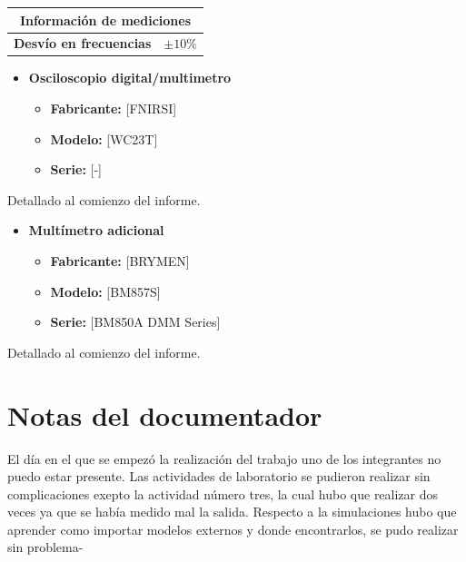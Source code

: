 
\begin{center}
\renewcommand{\arraystretch}{1.2}
\begin{tabular}{| m{4cm}| m{3cm} |}
\hline
\multicolumn{2}{|c|}{\textbf{Información de mediciones}} \\
\hline
\textbf{Desvío en frecuencias} & $\pm 10\%$ \\
\hline
\end{tabular}
\end{center}

\begin{itemize}
\item \textbf{Osciloscopio digital/multimetro}
\begin{itemize}
\item \textbf{Fabricante:} [FNIRSI]
\item \textbf{Modelo:} [WC23T]
\item \textbf{Serie:} [-]
\end{itemize}
\end{itemize}

\sangria{}Detallado al comienzo del informe.

\begin{itemize}
\item \textbf{Multímetro adicional}
\begin{itemize}
\item \textbf{Fabricante:} [BRYMEN]
\item \textbf{Modelo:} [BM857S]
\item \textbf{Serie:} [BM850A DMM Series]
\end{itemize}
\end{itemize}

\sangria{} Detallado al comienzo del informe.

\newpage

\section{Notas del documentador}
\sangria{} El día en el que se empezó la realización del trabajo uno de los integrantes no puedo estar presente. Las actividades de laboratorio  se pudieron realizar sin complicaciones exepto la actividad número tres, la cual hubo que realizar dos veces ya que se había medido mal la salida. Respecto a la simulaciones hubo que aprender como importar modelos externos y donde encontrarlos, se pudo realizar sin problema-

